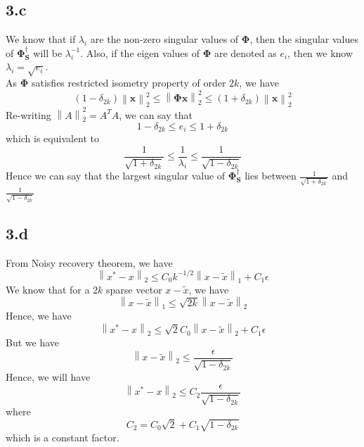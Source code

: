 \documentclass[12pt]{article}
\newcommand{\norm}[1]{\left\lVert #1 \right\rVert}
\begin{document}
\subsection*{3.c}
We know that if $\lambda_i$ are the non-zero singular values of $\boldsymbol{\Phi}$, then the singular values of $\boldsymbol{\Phi_S^\dagger}$ will be $\lambda_i^{-1}$. Also, if the eigen values of $\boldsymbol{\Phi}$ are denoted as $e_i$, then we know $\lambda_i = \sqrt{e_i}$.\\
As $\boldsymbol{\Phi}$ satisfies restricted isometry property of order $2k$, we have
$$(1 - \delta_{2k}) \norm{\boldsymbol{x}}_2^2 \leq \norm{\boldsymbol{\Phi x}}_2^2 \leq (1 + \delta_{2k}) \norm{\boldsymbol{x}}_2^2$$
Re-writing $\norm{A}_2^2 = A^T A$, we can say that 
$$1 - \delta_{2k} \leq e_i \leq 1 + \delta_{2k}$$
which is equivalent to
$$\frac{1}{\sqrt{1 + \delta_{2k}}} \leq \frac{1}{\lambda_i} \leq \frac{1}{\sqrt{1 - \delta_{2k}}}$$
Hence we can say that the largest singular value of $\boldsymbol{\Phi_S^\dagger}$ lies between $\frac{1}{\sqrt{1 + \delta_{2k}}}$ and $\frac{1}{\sqrt{1 - \delta_{2k}}}$
\subsection*{3.d}
From Noisy recovery theorem, we have
$$\norm{x^* - x}_2 \leq C_0 k^{-1/2} \norm{x - \tilde{x}}_1 + C_1 \epsilon$$
We know that for a $2k$ sparse vector $x - \tilde{x}$, we have
$$\norm{x - \tilde{x}}_1 \leq \sqrt{2k} \norm{x - \tilde{x}}_2$$
Hence, we have
$$\norm{x^* - x}_2 \leq \sqrt{2} C_0 \norm{x - \tilde{x}}_2 + C_1 \epsilon$$
But we have
$$\norm{x - \tilde{x}}_2 \leq \frac{\epsilon}{\sqrt{1 - \delta_{2k}}}$$
Hence, we will have
$$\norm{x^* - x}_2 \leq C_2 \frac{\epsilon}{\sqrt{1 - \delta_{2k}}}$$
where 
$$C_2 = C_0 \sqrt{2}+ C_1 \sqrt{1 - \delta_{2k}}$$
which is a constant factor.
\end{document}

